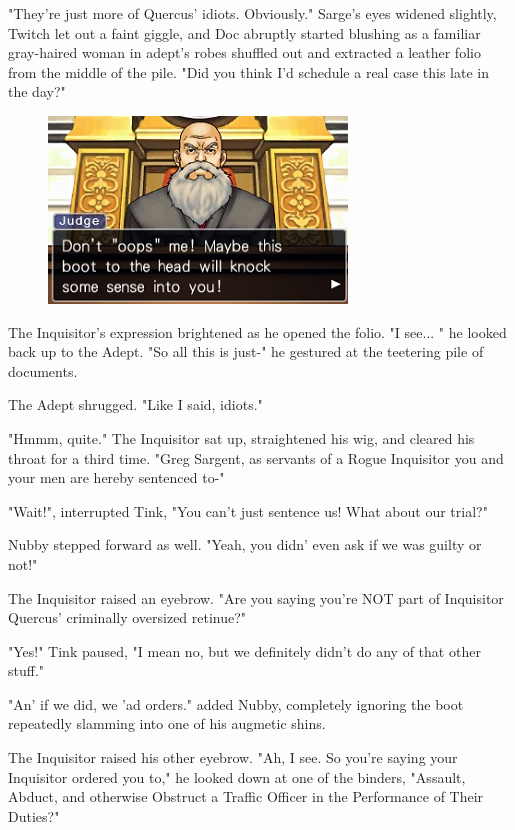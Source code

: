 "They're just more of Quercus' idiots. 
Obviously." Sarge's eyes widened slightly, Twitch let out a faint giggle, and Doc abruptly started blushing as a familiar gray-haired woman in adept's robes shuffled out and extracted a leather folio from the middle of the pile. 
"Did you think I'd schedule a real case this late in the day?"

\begin{figure}
	\begin{center}
		\includegraphics[width=\figwidth]{pics/21/3.png}
	\end{center}
\end{figure}
The Inquisitor's expression brightened as he opened the folio. 
"I see... 
" he looked back up to the Adept. 
"So all this is just-" he gestured at the teetering pile of documents.

The Adept shrugged. 
"Like I said, idiots."

"Hmmm, quite." The Inquisitor sat up, straightened his wig, and cleared his throat for a third time. 
"Greg Sargent, as servants of a Rogue Inquisitor you and your men are hereby sentenced to-"

"Wait!", interrupted Tink, "You can't just sentence us! 
What about our trial?"

Nubby stepped forward as well. 
"Yeah, you didn' even ask if we was guilty or not!"

The Inquisitor raised an eyebrow. 
 "Are you saying you're NOT part of Inquisitor Quercus' criminally oversized retinue?" 

"Yes!" Tink paused, "I mean no, but we definitely didn't do any of that other stuff."

"An' if we did, we 'ad orders." added Nubby, completely ignoring the boot repeatedly slamming into one of his augmetic shins.

The Inquisitor raised his other eyebrow. 
"Ah, I see. 
So you're saying your Inquisitor ordered you to," he looked down at one of the binders, "Assault, Abduct, and otherwise Obstruct a Traffic Officer in the Performance of Their Duties?"

